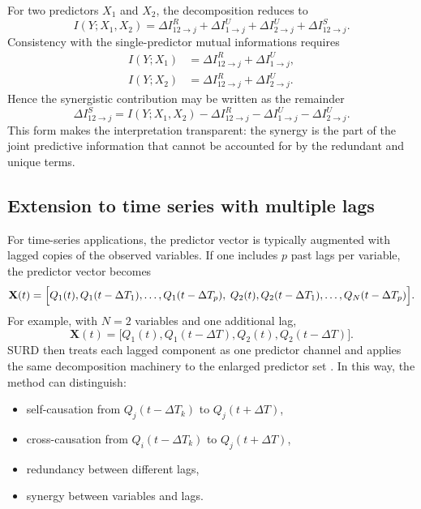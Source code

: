 \documentclass[fleqn,usenatbib]{mnras}
\begin{document}
For two predictors \(X_1\) and \(X_2\), the decomposition reduces to
\begin{equation}
I(Y;X_1,X_2)
=
\Delta I_{12\to j}^{R}
+
\Delta I_{1\to j}^{U}
+
\Delta I_{2\to j}^{U}
+
\Delta I_{12\to j}^{S}.
\label{eq:two_source_total}
\end{equation}
Consistency with the single-predictor mutual informations requires
\begin{align}
I(Y;X_1) &= \Delta I_{12\to j}^{R} + \Delta I_{1\to j}^{U},\\
I(Y;X_2) &= \Delta I_{12\to j}^{R} + \Delta I_{2\to j}^{U}.
\end{align}
Hence the synergistic contribution may be written as the remainder
\begin{equation}
\Delta I_{12\to j}^{S}
=
I(Y;X_1,X_2)
-
\Delta I_{12\to j}^{R}
-
\Delta I_{1\to j}^{U}
-
\Delta I_{2\to j}^{U}.
\end{equation}
This form makes the interpretation transparent: the synergy is the part of the joint predictive information that cannot be accounted for by the redundant and unique terms.

\subsection{Extension to time series with multiple lags}

For time-series applications, the predictor vector is typically augmented with lagged copies of the observed variables. If one includes \(p\) past lags per variable, the predictor vector becomes
\begin{equation}
\mathbf{X}(t)=
\Bigl[
Q_1(t),Q_1(t-\Delta T_1),\ldots,Q_1(t-\Delta T_p),\;
Q_2(t),Q_2(t-\Delta T_1),\ldots,Q_N(t-\Delta T_p)
\Bigr].
\label{eq:lagged_vector_general}
\end{equation}
For example, with \(N=2\) variables and one additional lag,
\begin{equation}
\mathbf{X}(t)=
\bigl[
Q_1(t),Q_1(t-\Delta T),Q_2(t),Q_2(t-\Delta T)
\bigr].
\label{eq:lagged_vector_two}
\end{equation}
SURD then treats each lagged component as one predictor channel and applies the same decomposition machinery to the enlarged predictor set \cite{MartinezSanchez2024SURD}. In this way, the method can distinguish:
\begin{itemize}
    \item self-causation from \(Q_j(t-\Delta T_k)\) to \(Q_j(t+\Delta T)\),
    \item cross-causation from \(Q_i(t-\Delta T_k)\) to \(Q_j(t+\Delta T)\),
    \item redundancy between different lags,
    \item synergy between variables and lags.
\end{itemize}
\end{document}
